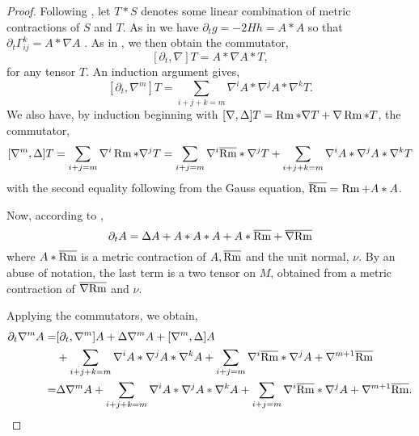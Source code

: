\documentclass{amsart}
\begin{document}
\begin{proof}
Following \cite{Hamilton:/1982}, let \(T \ast S\) denotes some linear combination of metric contractions of \(S\) and \(T\). As in \cite[3.3 Corollary (i)]{Huisken:/1986} we have \(\partial_t g = -2Hh = A \ast A\) so that \(\partial_t\Gamma_{ij}^k = A\ast\nabla A\) \cite[Section 7]{Huisken:/1984}. As in \cite[Section 13]{Hamilton:/1982}, we then obtain the commutator,
\[
[\partial_t, \nabla] T = A \ast \nabla A \ast T,
\]
for any tensor \(T\). An induction argument gives,
\[
[\partial_t, \nabla^m] T = \sum_{i+j+k=m} \nabla^i A \ast \nabla^j A \ast \nabla^k T.
\]
We also have, by induction beginning with \([\nabla, \Delta]T = \operatorname{Rm} \ast \nabla T + \nabla \operatorname{Rm} \ast T\), the commutator,
\[
[\nabla^m, \Delta] T = \sum\limits_{i+j=m} \nabla^i \operatorname{Rm} \ast \nabla^j T = \sum\limits_{i+j=m} \nabla^i \overline{\operatorname{Rm}} \ast \nabla^j T + \sum\limits_{i+j+k=m} \nabla^i A \ast \nabla^j A \ast \nabla^k T
\]
with the second equality following from the Gauss equation, \(\overline{\operatorname{Rm}} = \operatorname{Rm} + A \ast A\).

Now, according to \cite[3.3 Corollary (i)]{Huisken:/1986},
\[
\partial_t A = \Delta A + A \ast A \ast A + A \ast \overline{\operatorname{Rm}} + \overline{\nabla} \overline{\operatorname{Rm}}
\]
where \(A \ast \overline{\operatorname{Rm}}\) is a metric contraction of \(A, \overline{\operatorname{Rm}}\) and the unit normal, \(\nu\). By an abuse of notation, the last term is a two tensor on \(M\), obtained from a metric contraction of \(\overline{\nabla} \overline{\operatorname{Rm}}\) and \(\nu\).

Applying the commutators, we obtain,
\[
\begin{split}
\partial_t \nabla^m A =& [\partial_t, \nabla^m] A + \Delta \nabla^m A + [\nabla^m , \Delta] A \\
& + \sum_{i+j+k=m} \nabla^i A \ast \nabla^j A \ast \nabla^k A + \sum_{i+j=m} \nabla^i \overline{\operatorname{Rm}} \ast \nabla^j A + \nabla^{m+1} \overline{\operatorname{Rm}} \\
=& \Delta \nabla^m A + \sum_{i+j+k=m} \nabla^i A \ast \nabla^j A \ast \nabla^k A + \sum_{i+j=m} \nabla^i \overline{\operatorname{Rm}} \ast \nabla^j A + \nabla^{m+1} \overline{\operatorname{Rm}}.
\end{split}
\]


\end{proof}
\end{document}
